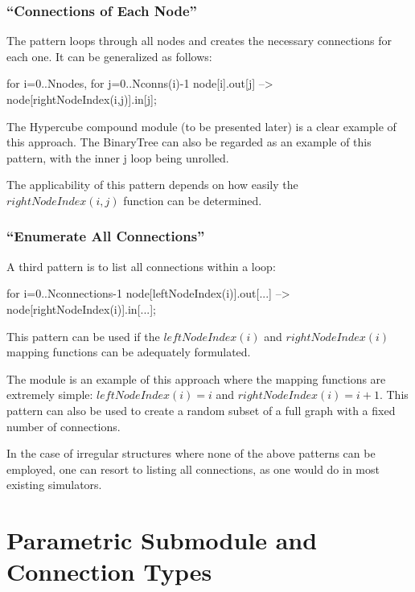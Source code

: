 \subsubsection{``Connections of Each Node''}
\label{sec:ned-lang:connections-of-each-node}

The pattern loops through all nodes and creates the necessary
connections for each one. It can be generalized as follows:

\begin{ned}
for i=0..Nnodes, for j=0..Nconns(i)-1 {
    node[i].out[j] --> node[rightNodeIndex(i,j)].in[j];
}
\end{ned}

The Hypercube compound module (to be
presented later) is a clear example of this approach. The BinaryTree can
also be regarded as an example of this pattern, with the inner j loop
being unrolled.

The applicability of this pattern depends on how easily the $rightNodeIndex(i,j)$
function can be determined.


\subsubsection{``Enumerate All Connections''}
\label{sec:ned-lang:enumerate-all-connections}


A third pattern is to list all connections within a loop:

\begin{ned}
for i=0..Nconnections-1 {
    node[leftNodeIndex(i)].out[...] --> node[rightNodeIndex(i)].in[...];
}
\end{ned}

This pattern can be used if the $leftNodeIndex(i)$ and $rightNodeIndex(i)$
mapping functions can be adequately formulated.

The  module is an example of this approach where the mapping
functions are extremely simple: $leftNodeIndex(i)=i$ and $rightNodeIndex(i) = i+1$.
This pattern can also be used to create a random subset of a full
graph with a fixed number of connections.

In the case of irregular structures where none of the above patterns
can be employed, one can resort to listing all connections, as one
would do in most existing simulators.



\section{Parametric Submodule and Connection Types}
\label{sec:ned-lang:parametric-submodule-and-connection-types}

